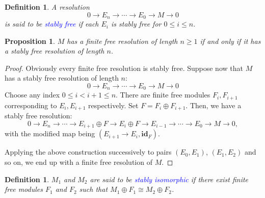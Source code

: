 \documentclass[12pt]{article}
\theoremstyle{thmstyle}
\newtheorem{proposition}[theorem]{Proposition}
\theoremstyle{defstyle}
\newtheorem{definition}[theorem]{Definition}
\newcommand{\id}{\mathbf{id}}
\newcommand{\define}[1]{\textcolor{blue}{\textit{#1}}}
\renewcommand{\le}{\leqslant}
\renewcommand{\ge}{\geqslant}
\begin{document}
\begin{definition}
    A resolution 
    \begin{equation*}
        0\to E_n\to\cdots\to E_0\to M\to 0
    \end{equation*}
    is said to be \define{stably free} if each $E_i$ is stably free for $0\le i\le n$.
\end{definition}

\begin{proposition}
    $M$ has a finite free resolution of length $n\ge 1$ if and only if it has a stably free resolution of length $n$.
\end{proposition}
\begin{proof}
    Obviously every finite free resolution is stably free. Suppose now that $M$ has a stably free resolution of length $n$: 
    \begin{equation*}
        0\to E_n\to\cdots\to E_0\to M\to 0
    \end{equation*}
    Choose any index $0\le i < i + 1\le n$. There are finite free modules $F_i, F_{i + 1}$ corresponding to $E_i, E_{i + 1}$ respectively. Set $F = F_i\oplus F_{i + 1}$. Then, we have a stably free resolution:
    \begin{equation*}
        0\to E_n\to\cdots\to E_{i + 1}\oplus F\to E_i\oplus F\to E_{i - 1}\to\cdots\to E_0\to M\to 0,
    \end{equation*}
    with the modified map being $\left(E_{i + 1}\to E_i, \id_{F}\right)$. 

    Applying the above construction successively to pairs $(E_0, E_1)$, $(E_1, E_2)$ and so on, we end up with a finite free resolution of $M$.
\end{proof}

\begin{definition}
    $M_1$ and $M_2$ are said to be \define{stably isomorphic} if there exist finite free modules $F_1$ and $F_2$ such that $M_1\oplus F_1\cong M_2\oplus F_2$.
\end{definition}
\end{document}
